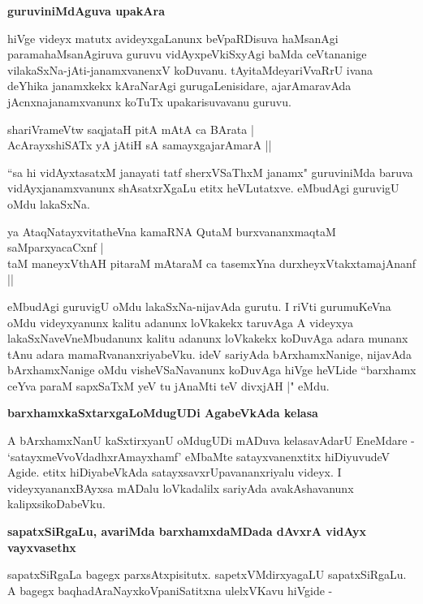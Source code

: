 {\bigskip
\noindent
{\large\bf guruviniMdAguva upakAra}}\label{page91a}
\medskip

\noindent
hiVge videyx matutx avideyxgaLanunx beVpaRDisuva haMsanAgi paramahaMsanAgiruva guruvu vidAyxpeVkiSxyAgi baMda ceVtananige vilakaSxNa-jAti-janamxvanenxV koDuvanu. tAyitaMdeyariVvaRrU ivana deYhika janamxkekx kAraNarAgi gurugaLenisidare, ajarAmaravAda jAcnxnajanamxvanunx koTuTx upakarisuvavanu guruvu.

\begin{shloka}
shariVrameVtw saqjataH pitA mAtA ca BArata |\\\label{91a}
AcArayxshiSATx yA jAtiH sA samayxgajarAmarA ||
\end{shloka}
\medskip

\noindent
``sa hi vidAyxtasatxM janayati tatf sherxVSaThxM janamx"\label{91b} guruviniMda baruva vidAyxjanamxvanunx shAsatxrXgaLu etitx heVLutatxve. eMbudAgi guruvigU oMdu lakaSxNa.

\begin{shloka}
ya AtaqNatayxvitatheVna kamaRNA QutaM burxvananxmaqtaM saMparxyacaCxnf |\\\label{91c}
taM maneyxVthAH pitaraM mAtaraM ca tasemxYna durxheyxVtakxtamajAnanf ||
\end{shloka}

\noindent
eMbudAgi guruvigU oMdu lakaSxNa-nijavAda gurutu. I riVti gurumuKeVna oMdu videyxyanunx kalitu adanunx loVkakekx taruvAga A videyxya lakaSxNaveVneMbudanunx kalitu adanunx loVkakekx koDuvAga adara munanx tAnu adara mamaRvananxriyabeVku. ideV sariyAda bArxhamxNanige, nijavAda bArxhamxNanige oMdu visheVSaNavanunx koDuvAga hiVge heVLide ``barxhamx ceYva paraM sapxSaTxM\label{92} yeV tu jAnaMti teV divxjAH |" eMdu.

{\bigskip
\noindent
{\large\bf barxhamxkaSxtarxgaLoMdugUDi AgabeVkAda kelasa}}\label{page92}
\medskip

\noindent
A bArxhamxNanU kaSxtirxyanU oMdugUDi mADuva kelasavAdarU EneMdare - `satayxmeVvoVdadhxrAmayxhamf'\label{92a} eMbaMte satayxvanenxtitx hiDiyuvudeV Agide. etitx hiDiyabeVkAda satayxsavxrUpavananxriyalu videyx. I videyxyananxBAyxsa mADalu loVkadalilx sariyAda avakAshavanunx kalipxsikoDabeVku.

{\bigskip
\noindent
{\large\bf sapatxSiRgaLu, avariMda barxhamxdaMDada dAvxrA vidAyx vayxvasethx}}\label{page92a}
\medskip

\noindent
sapatxSiRgaLa bagegx parxsAtxpisitutx. sapetxVMdirxyagaLU sapatxSiRgaLu. A bagegx baqhadAraNayxkoVpaniSatitxna ulelxVKavu hiVgide - 

